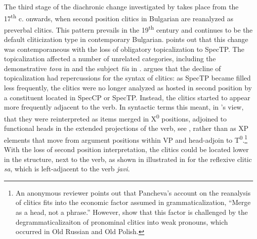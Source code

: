 \documentclass[output=paper,
modfonts,
newtxmath,
hidelinks
]{langscibook}
\begin{document}
The third stage of the diachronic change investigated by \citeauthor{pancheva2005} takes place from the 17\textsuperscript{th} c. onwards, when second position clitics in Bulgarian are reanalyzed as preverbal clitics. This pattern prevails in the 19\textsuperscript{th} century and continues to be the default cliticization type in contemporary Bulgarian. \citeauthor{pancheva2005} points out that this change was contemporaneous with the loss of obligatory topicalization to SpecTP. The topicalization affected a number of unrelated categories, including the demonstrative \textit{tova} in  and the subject \textit{tïa} in . \citeauthor{pancheva2005} argues that the decline of topicalization had repercussions for the syntax of clitics: as SpecTP became filled less frequently, the clitics were no longer analyzed as hosted in second position by a constituent located in SpecCP or SpecTP. Instead, the clitics started to appear more frequently adjacent to the verb. In syntactic terms this meant, in \citeauthor{pancheva2005}’s view, that they were reinterpreted as items merged in X\textsuperscript{0} positions, adjoined to functional heads in the extended projections of the verb, see , rather than as XP elements that move from argument positions within VP and head-adjoin to T\textsuperscript{0}.\footnote{\label{11:fn2}An anonymous reviewer points out that Pancheva’s account on the reanalysis of clitics fits into the economic factor assumed in grammaticalization, “Merge as a head, not a phrase.” However, \citet{jung-migdalski2015} show that this factor is challenged by the degrammaticalizaiton of pronominal clitics into weak pronouns, which occurred in Old Russian and Old Polish.} With the loss of second position interpretation, the clitics could be located lower in the structure, next to the verb, as shown in illustrated in  for the reflexive clitic \textit{sa}, which is left-adjacent to the verb \textit{javi}. 

\ea \label{11:ex5}
	 \label{11:ex5a}
	 \label{11:ex5b}
	\z
\z
\end{document}
